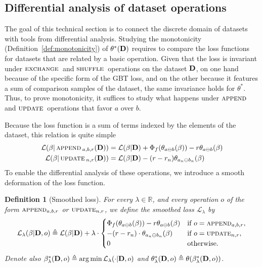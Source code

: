 \documentclass{article}
\DeclareMathOperator*{\argmin}{arg\,min}
\DeclareMathOperator*{\append}{\textsc{append}}
\DeclareMathOperator*{\update}{\textsc{update}}
\DeclareMathOperator*{\shuffle}{\textsc{shuffle}}
\DeclareMathOperator*{\exchange}{\textsc{exchange}}
\newtheorem{definition}{Definition}
\newcommand{\cL}{\mathcal L}
\newcommand{\bD}{{\bf D}}
\newcommand{\ab}{a\ominus{} b}
\newcommand{\anbn}{a_n\ominus{} b_n}
\begin{document}
\subsection{Differential analysis of dataset operations}
\label{sec:differential-analysis}

The goal of this technical section
is to connect the discrete domain of datasets
with tools from differential analysis.
Studying the monotonicity (Definition~\ref{def:monotonicity})
of $\theta^*(\bD)$ requires to compare the loss functions
for datasets that are related by a basic operation.
Given that the loss is invariant under $\exchange{}$ and $\shuffle{}$ operations
on the dataset $\bD$,
on one hand because of the specific form of the GBT loss,
and on the other because it features a sum of comparison samples of the dataset,
the same invariance holds for $\theta^*$.
Thus, to prove monotonicity,
it suffices to study what happens under $\append{}$ and $\update{}$ operations
that favor $a$ over $b$.

Because the loss function is a sum of terms indexed 
by the elements of the dataset, this relation is quite simple
\begin{align}
    \cL(\beta | \append{}_{a,b,r}(\bD)) &= \cL(\beta | \bD)
    + \Phi_f(\theta_{\ab}(\beta)) - r \theta_{\ab}(\beta) \\
    \cL(\beta | \update{}_{n,r}(\bD)) &= \cL(\beta | \bD)
     - (r - r_n) \theta_{\anbn}(\beta)
\end{align}
To enable the differential analysis of these operations,
we introduce a smooth deformation of the loss function.
\begin{definition}[Smoothed loss]
  For every $\lambda \in \mathbb{R}$,
  and every operation $o$ of the form
  $\append_{a, b, r}$ or $\update_{n, r}$, %
  we define the smoothed loss $\cL_\lambda$ by
  \begin{equation}
      \cL_\lambda (\beta | \bD, o) \triangleq 
      \cL(\beta | \bD) + 
      \lambda \cdot
      \begin{cases}
      \Phi_f(\theta_{\ab}(\beta)) - r\theta_{\ab}(\beta) &\text{if } o = \append_{a, b, r}, \\
      - (r - r_n) \cdot \theta_{\anbn} (\beta) &\text{if } o = \update_{n, r}, \\
      0 &\text{otherwise.}
      \end{cases}
  \end{equation}
  Denote also $\beta^*_\lambda(\bD, o) \triangleq \argmin \cL_\lambda(\cdot | \bD, o)$
  and $\theta^*_\lambda(\bD, o) \triangleq \theta(\beta^*_\lambda(\bD, o))$.
\end{definition}
\end{document}
